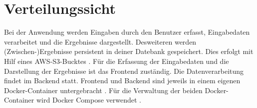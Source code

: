 \section{Verteilungssicht}
Bei der Anwendung werden Eingaben durch den Benutzer erfasst, Eingabedaten verarbeitet und die Ergebnisse dargestellt.
Desweiteren werden (Zwischen-)Ergebnisse persistent in deiner Datebank gespeichert.
Dies erfolgt mit Hilf eines AWS-S3-Bucktes \cite{awsSdk}.
Für die Erfassung der Eingabedaten und die Darstellung der Ergebnisse ist das Frontend zuständig.
Die Datenverarbeitung findet im Backend statt.
Frontend und Backend sind jeweils in einem eigenen Docker-Container untergebracht \cite{docker}. 
Für die Verwaltung der beiden Docker-Container wird Docker Compose verwendet \cite{docker_compose}.